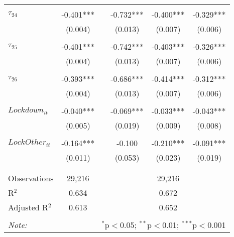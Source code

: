 \begin{tabular}{@{\extracolsep{-0pt}}lccccc}
                &           &&           &           &           \\[-2.1ex]
$\tau_{24}$     & -0.401*** && -0.732*** & -0.400*** & -0.329*** \\
                &  (0.004)  &&  (0.013)  &  (0.007)  &  (0.006)  \\
                &           &&           &           &           \\[-2.1ex]
$\tau_{25}$     & -0.401*** && -0.742*** & -0.403*** & -0.326*** \\
                &  (0.004)  &&  (0.013)  &  (0.007)  &  (0.006)  \\
                &           &&           &           &           \\[-2.1ex]
$\tau_{26}$     & -0.393*** && -0.686*** & -0.414*** & -0.312*** \\
                &  (0.004)  &&  (0.013)  &  (0.007)  &  (0.006)  \\
                &           &&           &           &           \\[-1.ex]
$Lockdown_{it}$ & -0.040*** && -0.069*** & -0.033*** & -0.043*** \\
                &  (0.005)  &&  (0.019)  &  (0.009)  &  (0.008)  \\
                &           &&           &           &           \\[-2.1ex]
$LockOther_{it}$& -0.164*** &&   -0.100  & -0.210*** & -0.091*** \\
                &  (0.011)  &&  (0.053)  &  (0.023)  &  (0.019)  \\
                &           &&           &           &           \\[-2.1ex]

\hline \\[-1.8ex] 
Observations     & 29,216 && \multicolumn{3}{c}{29,216} \\ 
R$^{2}$          &  0.634 && \multicolumn{3}{c}{0.672 } \\ 
Adjusted R$^{2}$ &  0.613 && \multicolumn{3}{c}{0.652 } \\ 
\hline 
\hline \\[-1.8ex] 
\textit{Note:}  & \multicolumn{5}{r}{$^{*}$p$<$0.05; $^{**}$p$<$0.01; $^{***}$p$<$0.001} \\ 
\end{tabular} 